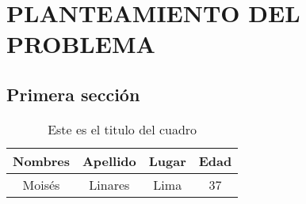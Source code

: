 \chapter{PLANTEAMIENTO DEL PROBLEMA}
    \section{Primera sección}
    \lipsum[2]
    \begin{table}[h]
        \centering
        \begin{tabular}{|c|c|c|c|}
        \hline
        Nombres & Apellido & Lugar & Edad \\
        \hline
             Moisés & Linares & Lima & 37 \\
        \hline
        \end{tabular}
        \caption{Este es el titulo del cuadro}
        \label{tab:Primara Tabla}
    \end{table}